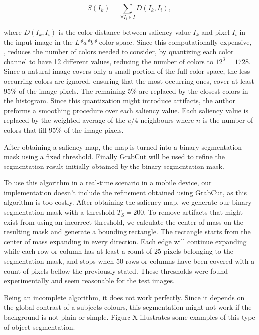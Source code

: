 \begin{equation}
S(I_{k}) = \sum_{\forall I_{i} \in I} D(I_{k}, I_{i}),
\end{equation}

where $D(I_{k}, I_{i})$ is the color distance between saliency value $I_{k}$ and pixel $I_{i}$ in the input image in the \emph{L*a*b*} color space. Since this computationally expensive, \citeauthor{cheng2011global}, reduces the number of colors needed to consider, by quantizing each color channel to have 12 different values, reducing the number of colors to $12^{3} = 1728$. Since a natural image covers only a small portion of the full color space, the less occurring colors are ignored, ensuring that the most occurring ones, cover at least 95\% of the image pixels. The remaining 5\% are replaced by the closest colors in the histogram. Since this quantization might introduce artifacts, the author preforms a smoothing procedure over each saliency value. Each saliency value is replaced by the weighted average of the $n/4$ neighbours where $n$ is the number of colors that fill 95\% of the image pixels.

After obtaining a saliency map, the map is turned into a binary segmentation mask using a fixed threshold. Finally GrabCut\cite{rother2004grabcut} will be used to refine the segmentation result initially obtained by the binary segmentation mask.

To use this algorithm in a real-time scenario in a mobile device, our implementation doesn't include the refinement obtained using GrabCut, as this algorithm is too costly. After obtaining the saliency map, we generate our binary segmentation mask with a threshold $T_{S} = 200$. To remove artifacts that might exist from using an incorrect threshold, we calculate the center of mass on the resulting mask and generate a bounding rectangle. The rectangle starts from the center of mass expanding in every direction. Each edge will continue expanding while each row or column has at least a count of 25 pixels belonging to the segmentation mask, and stops when 50 rows or columns have been covered with a count of pixels bellow the previously stated. These thresholds were found experimentally and seem reasonable for the test images.

Being an incomplete algorithm, it does not work perfectly. Since it depends on the global contrast of a subjects colours, this segmentation might not work if the background is not plain or simple. Figure X illustrates some examples of this type of object segmentation.


